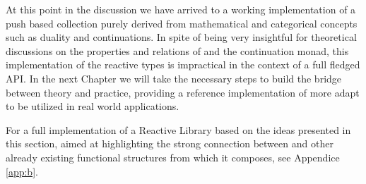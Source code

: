 At this point in the discussion we have arrived to a working implementation of a push based collection purely derived from mathematical and categorical concepts such as duality and continuations. In spite of being very insightful for theoretical discussions on the properties and relations of  and the continuation monad, this implementation of the reactive types is impractical in the context of a full fledged API. In the next Chapter we will take the necessary steps to build the bridge between theory and practice, providing a reference implementation of  more adapt to be utilized in real world applications.

For a full implementation of a Reactive Library based on the ideas presented in this section, aimed at highlighting the strong connection between  and other already existing functional structures from which it composes, see Appendice \ref{app:b}. 